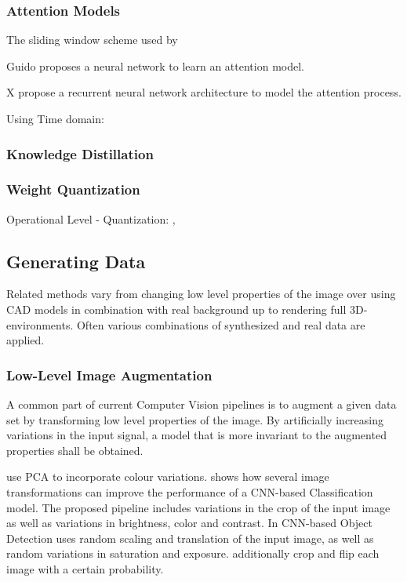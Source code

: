 \subsubsection{Attention Models}

The sliding window scheme used by

Guido proposes a neural network to learn an attention model.

X propose a recurrent neural network architecture to model the attention process.




Using Time domain:
\cite{Chen2018}



\subsubsection{Knowledge Distillation}


\subsubsection{Weight Quantization}
Operational Level - Quantization:
\cite{TripathiSanDiego}, 


\subsection{Generating Data}
\label{sec:training:related}

Related methods vary from changing low level properties of the image over using CAD models in combination with real background up to rendering full 3D-environments. Often various combinations of synthesized and real data are applied. 

\subsubsection{Low-Level Image Augmentation}

A common part of current Computer Vision pipelines is to augment a given data set by transforming low level properties of the image. By artificially increasing variations in the input signal, a model that is more invariant to the augmented properties shall be obtained.

\citeauthor{Krizhevsky2012a} \cite{Krizhevsky2012a} use \ac{PCA} to incorporate colour variations. \citeauthor{Howard2013} \cite{Howard2013} shows how several image transformations can improve the performance of a \ac{CNN}-based Classification model. The proposed pipeline includes variations in the crop of the input image as well as variations in brightness, color and contrast. In \ac{CNN}-based Object Detection \citeauthor{Redmon} \cite{Redmon} uses random scaling and translation of the input image, as well as random variations in saturation and exposure. \citeauthor{Liu} \cite{Liu} additionally crop and flip each image with a certain probability.

